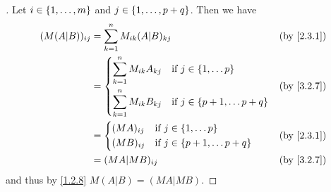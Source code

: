 \begin{proof}[]
  Let \(i \in \left\lbrace1, \dots, m\right\rbrace\) and \(j \in \left\lbrace1, \dots, p + q\right\rbrace\).
  Then we have
  \begin{align*}
    (M (A | B))_{i j} & = \sum_{k = 1}^n M_{i k} (A | B)_{k j}                                        &  & \text{(by \cref{2.3.1})} \\
                      & = \begin{dcases}
                            \sum_{k = 1}^n M_{i k} A_{k j} & \text{if } j \in \set{1, \dots p}         \\
                            \sum_{k = 1}^n M_{i k} B_{k j} & \text{if } j \in \set{p + 1, \dots p + q}
                          \end{dcases} &  & \text{(by \cref{3.2.7})}                                \\
                      & = \begin{dcases}
                            (MA)_{i j} & \text{if } j \in \set{1, \dots p}         \\
                            (MB)_{i j} & \text{if } j \in \set{p + 1, \dots p + q}
                          \end{dcases}                     &  & \text{(by \cref{2.3.1})}                                            \\
                      & = (MA | MB)_{i j}                                                             &  & \text{(by \cref{3.2.7})}
  \end{align*}
  and thus by \cref{1.2.8} \(M (A | B) = (MA | MB)\).
\end{proof}
